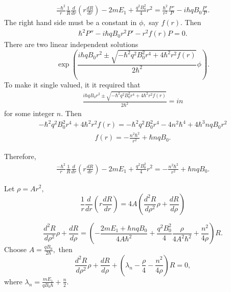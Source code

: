 \begin{enumerate}
           \begin{align*}
               \frac{-\hbar^2}{r}\frac{1}{R}\frac{d}{d r}(r\frac{d R}{d r})
               -2mE_1
               +\frac{q^2B_0^2}{4}r^2= 
               \frac{\hbar^2}{r^2}
                \frac{P''}{P}
               -i\hbar qB_0\frac{P'}{P}.
           \end{align*}
            The right hand side must be a constant in $\phi,$ say $f(r).$ Then
            \begin{align*}
                \hbar^2P''-i\hbar qB_0r^2P'-r^2f(r)P=0.
            \end{align*}
        There are two linear independent solutions 
        $$
        \exp\left(
        \frac{i\hbar qB_0r^2 \pm\sqrt{-\hbar^2q^2B_0^2r^4+4\hbar^2r^2f(r)}}{2\hbar^2}
        \phi\right).
        $$
        To make it single valued, it it required that 
        \begin{align*}
            \frac{i\hbar qB_0r^2 \pm\sqrt{-\hbar^2q^2B_0^2r^4+4\hbar^2r^2f(r)}}{2\hbar^2} = in
        \end{align*}
        for some integer $n.$
        Then
        \begin{align*}
            -\hbar^2q^2B_0^2r^4 + 4\hbar^2 r^2f(r)
            =-\hbar^2q^2B_0^2 r^4
            -4n^2\hbar^4
            +4\hbar^3nqB_0r^2
        \end{align*}
        \begin{align*}
            f(r)
            =
            -\frac{n^2\hbar^2}{r^2}
            +\hbar nqB_0.
        \end{align*}

        Therefore,
        \begin{align*}
                \frac{-\hbar^2}{r}\frac{1}{R}\frac{d}{d r}(r\frac{d R}{d r}) 
               -2mE_1
               +\frac{q^2B_0^2}{4}r^2= 
               -\frac{n^2\hbar^2}{r^2}
            +\hbar nqB_0.
           \end{align*}


        Let $\rho=Ar^2,$ 
        $$
        \frac{1}{r}\frac{d}{dr}(r\frac{dR}{dr})
        =4A(\frac{d^2R}{d\rho^2}\rho+\frac{dR}{d\rho})
        $$

        $$
        \frac{d^2R}{d\rho^2}\rho+\frac{dR}{d\rho}
        =(-\frac{2mE_1+\hbar nqB_0}{4A\hbar^2}
               +\frac{q^2B_0^2}{4}\frac{\rho}{4A^2\hbar^2}
               +\frac{n^2}{4\rho}
            )R.
        $$
        Choose $A=\frac{qB_0}{2\hbar},$
        then 
        $$
        \frac{d^2R}{d\rho^2}\rho+\frac{dR}{d\rho}
        +
        (\lambda_n
               -\frac{\rho}{4}
               -\frac{n^2}{4\rho}
            )R=0,
        $$
        where $\lambda_n=\frac{mE_1}{qB_0\hbar} + \frac{n}{2}.$


\end{enumerate}

